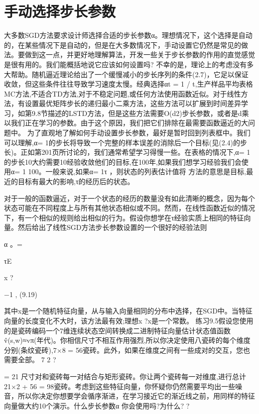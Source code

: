 {\section{手动选择步长参数}

大多数SGD方法要求设计师选择合适的步长参数α。理想情况下，这个选择是自动的，在某些情况下是自动的，但是在大多数情况下，手动设置它仍然是常见的做法。要做到这一点，并更好地理解算法，开发一些关于步长参数的作用的直觉感觉是很有用的。我们能概括地说它应该如何设置吗?
不幸的是，理论上的考虑没有多大帮助。随机逼近理论给出了一个缓慢减小的步长序列的条件(2.7)，它足以保证收敛，但这些条件往往导致学习速度太慢。经典选择αt = 1 / t,生产样品平均表格MC方法,不适合TD方法,对于不稳定问题,或任何方法使用函数近似。对于线性方法，有设置最优矩阵步长的递归最小二乘方法，这些方法可以扩展到时间差异学习，如第9.8节描述的LSTD方法，但是这些方法需要O(d2)步长参数，或者是d乘以我们正在学习的参数。由于这个原因，我们把它们排除在最需要函数逼近的大问题中。
为了直观地了解如何手动设置步长参数，最好是暂时回到列表框中。我们可以理解,α= 1的步长将导致一个完整的样本误差的消除后一个目标(见(2.4)的步长)。正如第201页所讨论的，我们通常希望学习得慢一些。在表格的情况下,α= 1的步长10大约需要10经验收敛他们的目标,在100年,如果我们想学习经验我们会使用α= 1 100。一般来说,如果α=
1τ
，则状态的列表估计值将
方法的意思是目标,最近的目标有最大的影响,τ的经历后的状态。

对于一般的函数逼近，对于一个状态的经历的数量没有如此清晰的概念，因为每个状态可能在不同程度上与所有其他状态相似或不同。然而，在线性函数近似的情况下，有一个相似的规则给出相似的行为。假设你想学在τ经验实质上相同的特征向量。然后给出了线性SGD方法步长参数设置的一个很好的经验法则


α
。=

τE

x ?

−1
, 					(9.19)

其中x是一个随机特征向量，从与输入向量相同的分布中选择，在SGD中。当特征向量的长度变化不大时，该方法最有效;理想x ?x是一个常数。
练习9.5假设您使用的是瓷砖编码一个7维连续状态空间转换成二进制特征向量估计状态值函数v̂(s,w)≈vπ(年代)。你相信尺寸不相互作用强烈,所以你决定使用八瓷砖的每个维度分别(条纹瓷砖),7×8 = 56瓷砖。此外，如果在维度之间有一些成对的交互，您也需要全部。
7 2 ?

= 21
尺寸对和瓷砖每一对结合与矩形瓷砖。你让两个瓷砖每一对维度,进行总计21×2 + 56 = 98瓷砖。考虑到这些特征向量，你怀疑你仍然需要平均出一些噪音，所以你决定你想要学会循序渐进，在学习接近它的渐近线之前，用同样的特征向量做大约10个演示。什么步长参数α
你会使用吗?为什么? 					?


}
